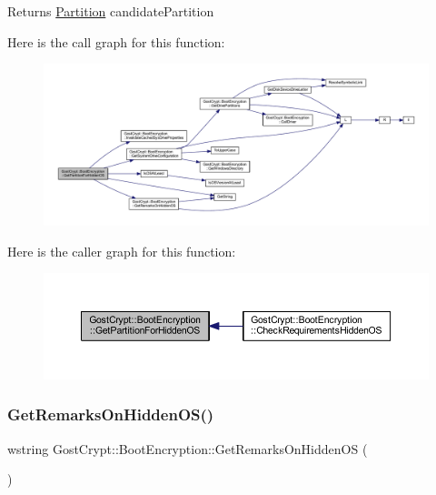 \begin{DoxyReturn}{Returns}
\hyperlink{struct_gost_crypt_1_1_partition}{Partition} candidate\+Partition 
\end{DoxyReturn}
Here is the call graph for this function\+:
\nopagebreak
\begin{figure}[H]
\begin{center}
\leavevmode
\includegraphics[width=350pt]{class_gost_crypt_1_1_boot_encryption_a4af9421f27c8e568add543c8b09602b3_cgraph}
\end{center}
\end{figure}
Here is the caller graph for this function\+:
\nopagebreak
\begin{figure}[H]
\begin{center}
\leavevmode
\includegraphics[width=350pt]{class_gost_crypt_1_1_boot_encryption_a4af9421f27c8e568add543c8b09602b3_icgraph}
\end{center}
\end{figure}
\mbox{\label{class_gost_crypt_1_1_boot_encryption_aaca146556fbaac863e487cdabcad4678}} 
\subsubsection{\texorpdfstring{Get\+Remarks\+On\+Hidden\+O\+S()}{GetRemarksOnHiddenOS()}}
{\footnotesize\ttfamily wstring Gost\+Crypt\+::\+Boot\+Encryption\+::\+Get\+Remarks\+On\+Hidden\+OS (\begin{DoxyParamCaption}{ }\end{DoxyParamCaption})\hspace{0.3cm}{\ttfamily [protected]}}



